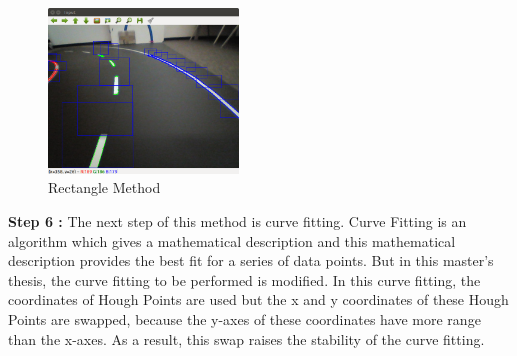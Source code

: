 \begin{figure}[H]
 \centering
  \includegraphics[width=0.45\textwidth]{./Bilder/Case1_Rectangles.png}
	\caption{Rectangle Method}
	\label{fig:Case1_Rectangles}
\end{figure}


\textbf{Step 6 : }The next step of this method is curve fitting. Curve Fitting is an algorithm which gives a mathematical description and this mathematical description provides the best fit for a series of data points. But in this master's thesis, the curve fitting to be performed is modified. In this curve fitting, the coordinates of Hough Points are used but the x and y coordinates of these Hough Points are swapped, because the y-axes of these coordinates have more range than the x-axes. As a result, this swap raises the stability of the curve fitting.

